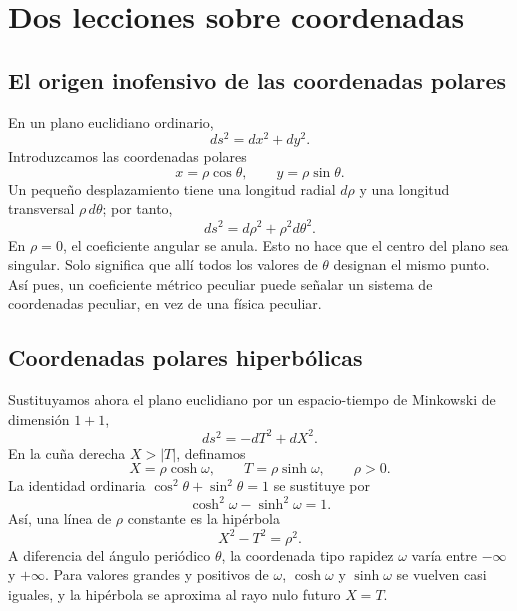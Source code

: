 \section{Dos lecciones sobre coordenadas}

\subsection{El origen inofensivo de las coordenadas polares}

En un plano euclidiano ordinario,
\begin{equation}
ds^2=dx^2+dy^2.
\end{equation}
Introduzcamos las coordenadas polares
\begin{equation}
x=\rho\cos\theta,
\qquad
y=\rho\sin\theta .
\end{equation}
Un pequeño desplazamiento tiene una longitud radial \(d\rho\) y una longitud transversal \(\rho\,d\theta\); por tanto,
\begin{equation}
ds^2=d\rho^2+\rho^2d\theta^2.
\label{eq:l03-polar}
\end{equation}
En \(\rho=0\), el coeficiente angular se anula. Esto no hace que el centro del plano sea singular. Solo significa que allí todos los valores de \(\theta\) designan el mismo punto. Así pues, un coeficiente métrico peculiar puede señalar un sistema de coordenadas peculiar, en vez de una física peculiar.

\subsection{Coordenadas polares hiperbólicas}

Sustituyamos ahora el plano euclidiano por un espacio-tiempo de Minkowski de dimensión \(1+1\),
\begin{equation}
ds^2=-dT^2+dX^2.
\end{equation}
En la cuña derecha \(X>|T|\), definamos
\begin{equation}
X=\rho\cosh\omega,
\qquad
T=\rho\sinh\omega,
\qquad \rho>0 .
\label{eq:l03-rindler-transform}
\end{equation}
La identidad ordinaria \(\cos^2\theta+\sin^2\theta=1\) se sustituye por
\begin{equation}
\cosh^2\omega-\sinh^2\omega=1.
\end{equation}
Así, una línea de \(\rho\) constante es la hipérbola
\begin{equation}
X^2-T^2=\rho^2.
\end{equation}
A diferencia del ángulo periódico \(\theta\), la coordenada tipo rapidez \(\omega\) varía entre \(-\infty\) y \(+\infty\). Para valores grandes y positivos de \(\omega\), \(\cosh\omega\) y \(\sinh\omega\) se vuelven casi iguales, y la hipérbola se aproxima al rayo nulo futuro \(X=T\).

